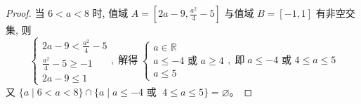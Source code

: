 \begin{proof}
当 \(6 < a < 8\) 时, 值域 \(A = \left\lbrack  {{2a} - 9, \frac{{a}^{2}}{4} - 5}\right\rbrack\) 与值域 \(B = \left\lbrack  {-1, 1}\right\rbrack\) 有非空交集, 则
\[
\begin{cases}
{2a} - 9 < \frac{{a}^{2}}{4} - 5 \\
\frac{{a}^{2}}{4} - 5 \geq  -1 \\
{2a} - 9 \leq  1
\end{cases}, 
\; \text{解得} \;
\begin{cases}
a \in \mathbb{R} \\
a \leq  -4\text{ 或 }a \geq  4 \\
a \leq 5
\end{cases}, 
\; \text{即} \; a \leq -4\text{ 或 }4 \leq  a \leq  5
\]
又 \(\{ a \mid  6 <  a < 8\}  \cap  \{ a \mid  a \leq  -4\text{ 或 }\; 4 \leq  a \leq  5\} = \varnothing \)。






\end{proof}
